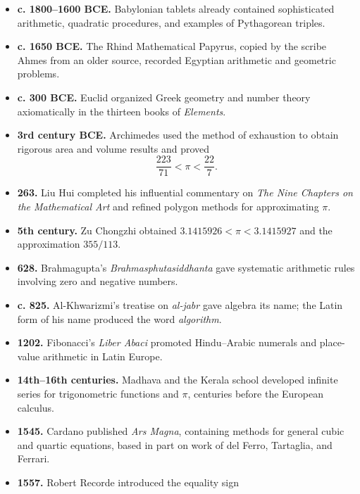     \begin{itemize}
        \item \textbf{c. 1800--1600 BCE.} Babylonian tablets already contained
              sophisticated arithmetic, quadratic procedures, and examples of
              Pythagorean triples.
        \item \textbf{c. 1650 BCE.} The Rhind Mathematical Papyrus, copied by
              the scribe Ahmes from an older source, recorded Egyptian
              arithmetic and geometric problems.
        \item \textbf{c. 300 BCE.} Euclid organized Greek geometry and number
              theory axiomatically in the thirteen books of
              \textit{Elements}.
        \item \textbf{3rd century BCE.} Archimedes used the method of exhaustion
              to obtain rigorous area and volume results and proved
              \[
                  \frac{223}{71}<\pi<\frac{22}{7}.
              \]
        \item \textbf{263.} Liu Hui completed his influential commentary on
              \textit{The Nine Chapters on the Mathematical Art} and refined
              polygon methods for approximating $\pi$.
        \item \textbf{5th century.} Zu Chongzhi obtained
              $3.1415926<\pi<3.1415927$ and the approximation
              $355/113$.
        \item \textbf{628.} Brahmagupta's
              \textit{Brahmasphutasiddhanta} gave systematic arithmetic rules
              involving zero and negative numbers.
        \item \textbf{c. 825.} Al-Khwarizmi's treatise on
              \emph{al-jabr} gave algebra its name; the Latin form of his name
              produced the word \emph{algorithm}.
        \item \textbf{1202.} Fibonacci's \textit{Liber Abaci} promoted
              Hindu--Arabic numerals and place-value arithmetic in Latin
              Europe.
        \item \textbf{14th--16th centuries.} Madhava and the Kerala school
              developed infinite series for trigonometric functions and $\pi$,
              centuries before the European calculus.
        \item \textbf{1545.} Cardano published \textit{Ars Magna}, containing
              methods for general cubic and quartic equations, based in part on
              work of del Ferro, Tartaglia, and Ferrari.
        \item \textbf{1557.} Robert Recorde introduced the equality sign

\end{itemize}
